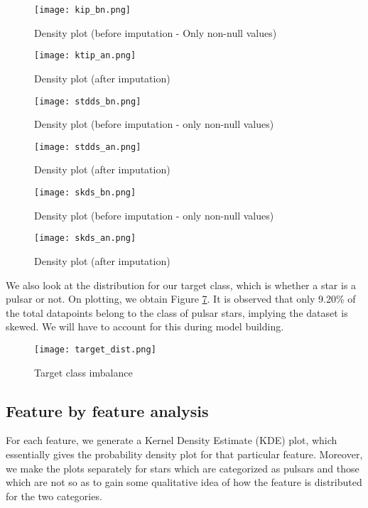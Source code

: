 \documentclass[conference]{IEEEtran}
\begin{document}
\begin{figure}[tbh]
\centering
\texttt{[image: kip\_bn.png]}
\caption{Density plot (before imputation - Only non-null values)}
\label{ktip_bn}
\end{figure}

\begin{figure}[tbh]
\centering
\texttt{[image: ktip\_an.png]}
\caption{Density plot (after imputation)}
\label{ktip_an}
\end{figure}

\begin{figure}[tbh]
\centering
\texttt{[image: stdds\_bn.png]}
\caption{Density plot (before imputation - only non-null values)}
\label{stdds_bn}
\end{figure}

\begin{figure}[tbh]
\centering
\texttt{[image: stdds\_an.png]}
\caption{Density plot (after imputation)}
\label{stdds_an}
\end{figure}

\begin{figure}[tbh]
\centering
\texttt{[image: skds\_bn.png]}
\caption{Density plot (before imputation - only non-null values)}
\label{skds_bn}
\end{figure}

\begin{figure}[tbh]
\centering
\texttt{[image: skds\_an.png]}
\caption{Density plot (after imputation)}
\label{skds_an}
\end{figure}
 
We also look at the distribution for our target class, which is whether a star is a pulsar or not. On plotting, we obtain Figure \ref{target_dist}. It is observed that only 9.20\% of the total datapoints belong to the class of pulsar stars, implying the dataset is skewed. We will have to account for this during model building.


\begin{figure}[tbh]
\centering
\texttt{[image: target\_dist.png]}
\caption{Target class imbalance}
\label{target_dist}
\end{figure}

\subsection{Feature by feature analysis}

For each feature, we generate a Kernel Density Estimate (KDE) plot, which essentially gives the probability density plot for that particular feature. Moreover, we make the plots separately for stars which are categorized as pulsars and those which are not so as to gain some qualitative idea of how the feature is distributed for the two categories.
\end{document}
